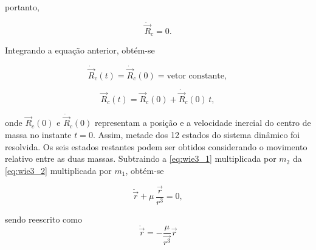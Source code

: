 portanto,

\begin{equation}
 \ddot{\vec R}_{c} = 0.
\end{equation}

Integrando a equação anterior, obtém-se

\begin{equation}
\dot{\vec{R}}_c(t) = \dot{\vec{R}}_c(0) = \text{vetor constante},
\end{equation}

\begin{equation}
\vec{R}_c(t) = \vec{R}_c(0) + \dot{\vec{R}}_c(0)\,t,
\end{equation}

onde $\vec{R}_{c}(0)$ e $\dot{\vec{R}}_{c}(0)$ representam a posição e a velocidade inercial do centro de massa no instante $t = 0$.
Assim, metade dos 12 estados do sistema dinâmico foi resolvida. Os seis estados restantes podem ser obtidos considerando o movimento relativo entre as duas massas.
Subtraindo a \eqref{eq:wie3_1} multiplicada por $m_2$ da \eqref{eq:wie3_2} multiplicada por $m_1$, obtém-se

\begin{equation}
\ddot{\vec{r}} + \mu\,\frac{\vec{r}}{r^3} = 0,
\end{equation}

sendo reescrito como
\begin{equation}
\label{eq:eqFundamentalDoisCorpos}
\ddot {\vec r} = -\frac{\mu}{\vec {r^3}}\vec r
\end{equation}





